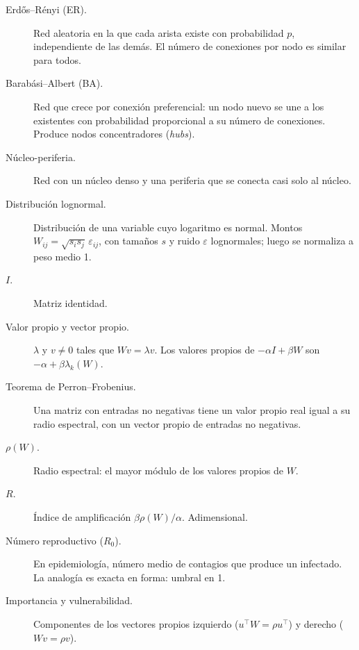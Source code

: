 \begin{terminos}
\begin{description}
\item[Erdős–Rényi (ER).] Red aleatoria en la que cada arista existe con probabilidad
$p$, independiente de las demás. El número de conexiones por nodo es similar para
todos.
\item[Barabási–Albert (BA).] Red que crece por conexión preferencial: un nodo nuevo se
une a los existentes con probabilidad proporcional a su número de conexiones. Produce
nodos concentradores (\emph{hubs}).
\item[Núcleo-periferia.] Red con un núcleo denso y una periferia que se conecta casi
solo al núcleo.
\item[Distribución lognormal.] Distribución de una variable cuyo logaritmo es normal.
Montos $W_{ij}=\sqrt{s_is_j}\,\varepsilon_{ij}$, con tamaños $s$ y ruido $\varepsilon$
lognormales; luego se normaliza a peso medio 1.
\item[$I$.] Matriz identidad.
\item[Valor propio y vector propio.] $\lambda$ y $v\neq0$ tales que $Wv=\lambda v$. Los
valores propios de $-\alpha I+\beta W$ son $-\alpha+\beta\lambda_k(W)$.
\item[Teorema de Perron–Frobenius.] Una matriz con entradas no negativas tiene un valor
propio real igual a su radio espectral, con un vector propio de entradas no negativas.
\item[$\rho(W)$.] Radio espectral: el mayor módulo de los valores propios de $W$.
\item[$R$.] Índice de amplificación $\beta\rho(W)/\alpha$. Adimensional.
\item[Número reproductivo ($R_0$).] En epidemiología, número medio de contagios que
produce un infectado. La analogía es exacta en forma: umbral en 1.
\item[Importancia y vulnerabilidad.] Componentes de los vectores propios izquierdo
($u^\top W=\rho u^\top$) y derecho ($Wv=\rho v$).
\end{description}
\end{terminos}
\begin{preguntas}
\end{preguntas}

